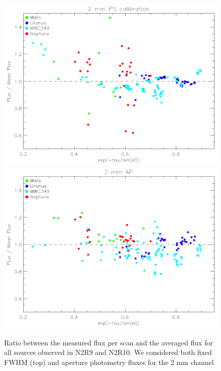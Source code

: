 \begin{figure}[ht]
\begin{center}
\includegraphics[clip, angle=0, scale = 0.7]{Figures/flux_2mm_ratio_run22_23.pdf}
\includegraphics[clip, angle=0, scale = 0.7]{Figures/flux_2mm_ap_ratio_run22_23.pdf}
\caption{Ratio between the measured flux per scan and the averaged flux for all sources observed in N2R9 and N2R10. We considered both fixed FWHM (top) and aperture photometry fluxes for the 2 mm channel }
\label{fig:fluxvsscan}
\end{center}
\end{figure}
